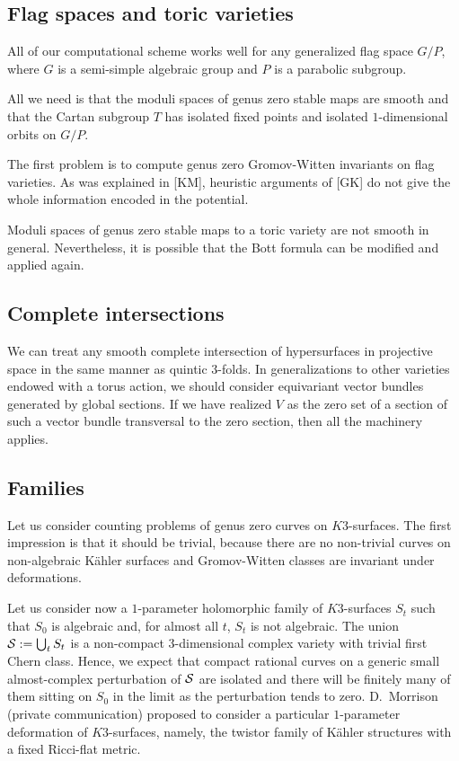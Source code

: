 \documentclass{amsart}
\begin{document}
\subsection{Flag spaces and toric varieties}

All of our computational scheme works well for any generalized flag space
$G/P$, where $G$ is a semi-simple algebraic group and $P$ is a parabolic
subgroup.

All we need is that the moduli spaces of genus zero stable maps are smooth and
that the Cartan subgroup $T$ has isolated fixed points and isolated
 $1$-dimensional orbits on $G/P$.

The first problem  is to compute genus zero Gromov-Witten invariants on flag
varieties. As was explained in [KM], heuristic arguments of [GK] do not give
the whole information encoded in the potential.


Moduli spaces of genus zero stable maps to a toric variety
 are not smooth in general. Nevertheless, it is possible that the  Bott formula
can be modified and applied again.







\subsection{Complete intersections}

We can treat any smooth complete intersection of hypersurfaces in projective
space in the same manner as quintic $3$-folds.
  In generalizations to other varieties endowed with a torus action,  we should
consider equivariant vector bundles generated by global sections. If we have
realized $V$ as the zero set of a section of such a vector bundle transversal
to the zero section, then all the machinery applies.

\subsection{Families}

Let us consider counting problems of genus zero curves on $K3$-surfaces. The
first impression is that it should be trivial, because there are no non-trivial
curves on non-algebraic K\"ahler surfaces and Gromov-Witten classes are
invariant under deformations.


Let us consider now a $1$-parameter holomorphic family of $K3$-surfaces $S_t$
 such that $S_0$ is algebraic and, for almost all $t$, $S_t$ is not algebraic.
   The union $\mathcal S:=\bigcup_t S_t$ is a non-compact $3$-dimensional complex
variety with  trivial first Chern class.
  Hence, we expect that  compact rational curves on a generic small
almost-complex  perturbation of $\mathcal S$ are isolated and there will be
finitely many of them
 sitting on $S_0$ in the limit as the perturbation tends to zero.
 D.~Morrison (private communication) proposed to consider a particular
$1$-parameter deformation of $K3$-surfaces, namely, the twistor family
 of K\"ahler structures with a fixed Ricci-flat metric.
\end{document}
